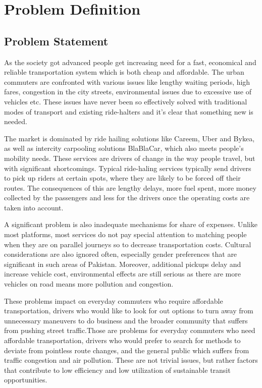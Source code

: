 
\chapter{Problem Definition}


\section{Problem Statement}
As the society got advanced people get increasing need for a fast, economical and reliable transportation system which is both cheap and affordable. The urban commuters are confronted with various issues like lengthy waiting periods, high fares, congestion in the city streets, environmental issues due to excessive use of vehicles etc. These issues have never been so effectively solved with traditional modes of transport and existing ride-halters and it's clear that something new is needed.

The market is dominated by ride hailing solutions like Careem, Uber and Bykea, as well as intercity carpooling solutions BlaBlaCar, which also meets people's mobility needs. These services are drivers of change in the way people travel, but with significant shortcomings. Typical ride-haling services typically send drivers to pick up riders at certain spots, where they are likely to be forced off their routes. The consequences of this are lengthy delays, more fuel spent, more money collected by the passengers and less for the drivers once the operating costs are taken into account.

A significant problem is also inadequate mechanisms for share of expenses. Unlike most platforms, most services do not pay special attention to matching people when they are on parallel journeys so to decrease transportation costs. Cultural considerations are also ignored often, especially gender preferences that are significant in such areas of Pakistan. Moreover, additional pickups delay and increase vehicle cost, environmental effects are still serious as there are more vehicles on road means more pollution and congestion.

These problems impact on everyday commuters who require affordable transportation, drivers who would like to look for out options to turn away from unnecessary maneuvers to do business and the broader community that suffers from pushing street traffic.Those are problems for everyday commuters who need affordable transportation, drivers who would prefer to search for methods to deviate from pointless route changes, and the general public which suffers from traffic congestion and air pollution. These are not trivial issues, but rather factors that contribute to low efficiency and low utilization of sustainable transit opportunities.

